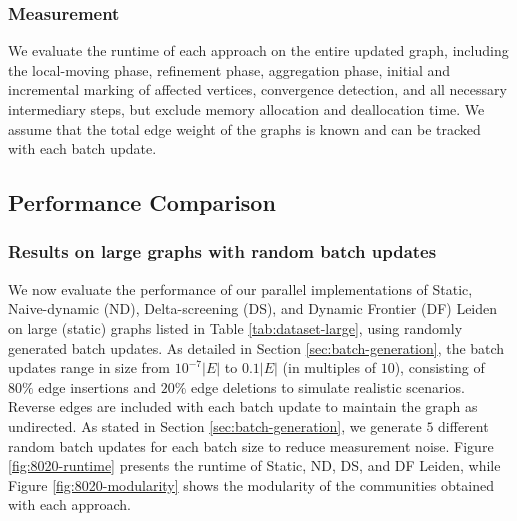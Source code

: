 \subsubsection{Measurement}
\label{sec:measurement}

We evaluate the runtime of each approach on the entire updated graph, including the local-moving phase, refinement phase, aggregation phase, initial and incremental marking of affected vertices, convergence detection, and all necessary intermediary steps, but exclude memory allocation and deallocation time. We assume that the total edge weight of the graphs is known and can be tracked with each batch update.








\subsection{Performance Comparison}
\label{sec:performance-comparison}

\subsubsection{Results on large graphs with random batch updates}

We now evaluate the performance of our parallel implementations of Static, Naive-dynamic (ND), Delta-screening (DS), and Dynamic Frontier (DF) Leiden on large (static) graphs listed in Table \ref{tab:dataset-large}, using randomly generated batch updates. As detailed in Section \ref{sec:batch-generation}, the batch updates range in size from $10^{-7}|E|$ to $0.1|E|$ (in multiples of $10$), consisting of $80\%$ edge insertions and $20\%$ edge deletions to simulate realistic scenarios. Reverse edges are included with each batch update to maintain the graph as undirected. As stated in Section \ref{sec:batch-generation}, we generate $5$ different random batch updates for each batch size to reduce measurement noise. Figure \ref{fig:8020-runtime} presents the runtime of Static, ND, DS, and DF Leiden, while Figure \ref{fig:8020-modularity} shows the modularity of the communities obtained with each approach.

